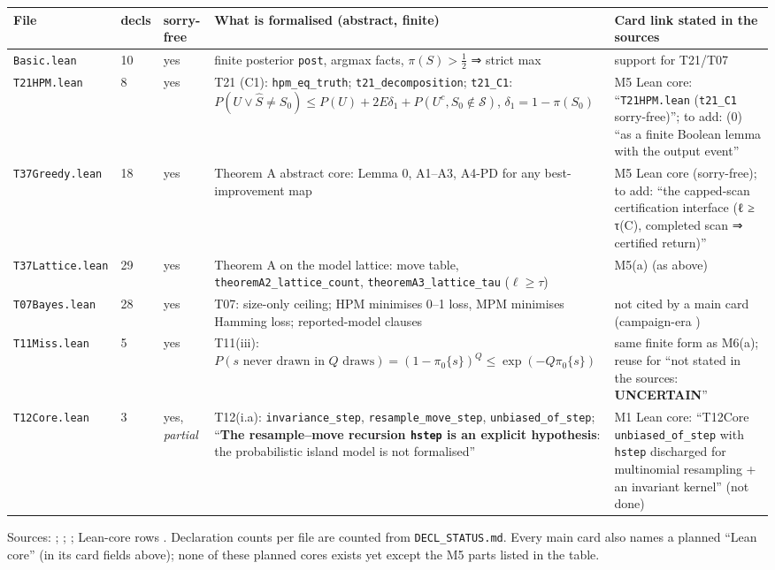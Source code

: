 {\small
\begin{xltabular}{\linewidth}{@{}p{2.6cm}p{1.1cm}p{1.6cm}Xp{3.6cm}@{}}
\toprule
File & decls & sorry-free & What is formalised (abstract, finite) & Card link stated in the sources \\
\midrule
\endhead
\texttt{Basic.lean} & 10 & yes & finite posterior \texttt{post}, argmax facts, $\pi(S)>\tfrac12$ ⇒ strict max & support for T21/T07 \\
\texttt{T21HPM.lean} & 8 & yes & T21 (C1): \texttt{hpm\_eq\_truth}; \texttt{t21\_decomposition}; \texttt{t21\_C1}: $P(U\vee\hat{S}\ne S_0)\le P(U)+2E\delta_1+P(U^{c},S_0\notin\mathcal{S})$, $\delta_1=1-\pi(S_0)$ & M5 Lean core: ``\texttt{T21HPM.lean} (\texttt{t21\_C1} sorry-free)''; to add: (0) ``as a finite Boolean lemma with the output event'' \\
\texttt{T37Greedy.lean} & 18 & yes & Theorem A abstract core: Lemma 0, A1–A3, A4-PD for any best-improvement map & M5 Lean core (sorry-free); to add: ``the capped-scan certification interface (ℓ ≥ τ(C), completed scan ⇒ certified return)'' \\
\texttt{T37Lattice.lean} & 29 & yes & Theorem A on the model lattice: move table, \texttt{theoremA2\_lattice\_count}, \texttt{theoremA3\_lattice\_tau} ($\ell\ge\tau$) & M5(a) (as above) \\
\texttt{T07Bayes.lean} & 28 & yes & T07: size-only ceiling; HPM minimises 0–1 loss, MPM minimises Hamming loss; reported-model clauses & not cited by a main card (campaign-era ) \\
\texttt{T11Miss.lean} & 5 & yes & T11(iii): $P(s\text{ never drawn in }Q\text{ draws})=(1-\pi_0\{s\})^{Q}\le\exp(-Q\pi_0\{s\})$ & same finite form as M6(a); reuse for  ``not stated in the sources: \textbf{UNCERTAIN}''  \\
\texttt{T12Core.lean} & 3 & yes, \emph{partial} & T12(i.a): \texttt{invariance\_step}, \texttt{resample\_move\_step}, \texttt{unbiased\_of\_step}; ``\textbf{The resample–move recursion \texttt{hstep} is an explicit hypothesis}: the probabilistic island model is not formalised'' & M1 Lean core: ``T12Core \texttt{unbiased\_of\_step} with \texttt{hstep} discharged for multinomial resampling + an invariant kernel'' (not done) \\
\bottomrule
\end{xltabular}
}
\noindent Sources: ; ; ; Lean-core rows . Declaration counts per file are counted from \texttt{DECL\_STATUS.md}. Every main card also names a planned ``Lean core'' (in its card fields above); none of these planned cores exists yet except the M5 parts listed in the table.

\fussy
